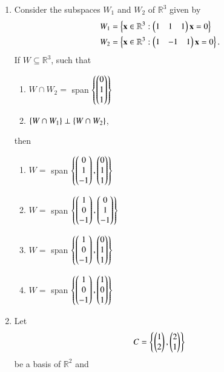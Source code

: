 \renewcommand{\theequation}{\theenumi}
\renewcommand{\thefigure}{\theenumi}
\begin{enumerate}[label=\thesection.\arabic*.,ref=\thesection.\theenumi]

\item Consider the subspaces $W_1$ and $W_2$ of $\mathbb{R}^3$ given by
\begin{align}
W_1 &= \left\{\mathbf{x} \in \mathbb{R}^3: \begin{pmatrix}1 & 1 & 1\end{pmatrix}\mathbf{x} = 0\right\}
\\
W_2 &= \left\{\mathbf{x} \in \mathbb{R}^3: \begin{pmatrix}1 & -1 & 1\end{pmatrix}\mathbf{x} = 0\right\}.
\end{align}
If $W \subseteq \mathbb{R}^3$, such that 
\begin{enumerate}
\item $W \cap W_2 =$ span $\left\{\begin{pmatrix}0\\1\\1\end{pmatrix}\right\}$
\item $\left\{W \cap W_1\right\} \perp \left\{W \cap W_2\right\}$, 
\end{enumerate}
then 
\begin{enumerate}
\item $W =$ span $\left\{\begin{pmatrix}0\\1\\-1\end{pmatrix},\begin{pmatrix}0\\1\\1\end{pmatrix}\right\}$
\item $W =$ span $\left\{\begin{pmatrix}1\\0\\-1\end{pmatrix},\begin{pmatrix}0\\1\\-1\end{pmatrix}\right\}$
\item $W =$ span $\left\{\begin{pmatrix}1\\0\\-1\end{pmatrix},\begin{pmatrix}0\\1\\1\end{pmatrix}\right\}$
\item $W =$ span $\left\{\begin{pmatrix}1\\0\\-1\end{pmatrix},\begin{pmatrix}1\\0\\1\end{pmatrix}\right\}$
\end{enumerate}
\item Let
\begin{align}
C = \left\{\begin{pmatrix}1 \\ 2\end{pmatrix},\begin{pmatrix}2 \\ 1\end{pmatrix}\right\}
\end{align}
be a basis of $\mathbb{R}^2$ and 
\begin{align}

\end{align}
\end{enumerate}
